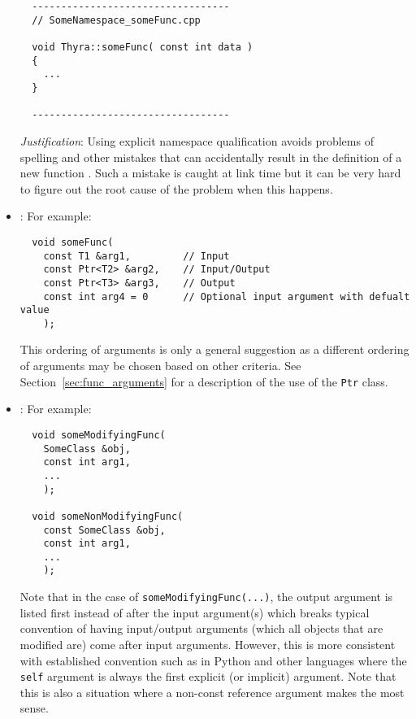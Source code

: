 \begin{itemize}
{\small\begin{verbatim}
  ----------------------------------
  // SomeNamespace_someFunc.cpp

  void Thyra::someFunc( const int data )
  {
    ...
  }

  ----------------------------------
\end{verbatim}}

{}\textit{Justification}: Using explicit namespace qualification avoids
problems of spelling and other mistakes that can accidentally result in the
definition of a new function {}\cite[Section 8.2]{stroustrup97}.  Such a
mistake is caught at link time but it can be very hard to figure out the root
cause of the problem when this happens.


{}\item\GCGFuncArgsOrder: For example:

{\small\begin{verbatim}
  void someFunc(
    const T1 &arg1,         // Input
    const Ptr<T2> &arg2,    // Input/Output
    const Ptr<T3> &arg3,    // Output
    const int arg4 = 0      // Optional input argument with defualt value
    );
\end{verbatim}}

This ordering of arguments is only a general suggestion as a different
ordering of arguments may be chosen based on other criteria.  See
Section~\ref{sec:func_arguments} for a description of the use of the
{}\texttt{Ptr} class.


{}\item\GCGNomemberObjectFuncs: For example:

{\small\begin{verbatim}
  void someModifyingFunc(
    SomeClass &obj,
    const int arg1,
    ...
    );

  void someNonModifyingFunc(
    const SomeClass &obj,
    const int arg1,
    ...
    );
\end{verbatim}}

Note that in the case of {}\texttt{someModifyingFunc(...)}, the output
argument is listed first instead of after the input argument(s) which breaks
typical convention of having input/output arguments (which all objects that
are modified are) come after input arguments.  However, this is more
consistent with established convention such as in Python and other languages
where the {}\texttt{self} argument is always the first explicit (or implicit)
argument.  Note that this is also a situation where a non-const reference
argument makes the most sense.



\end{itemize}
